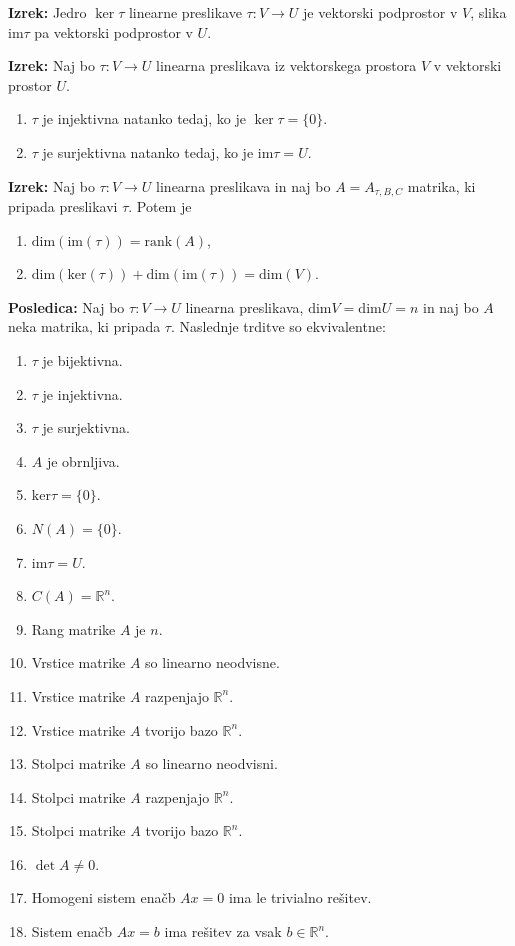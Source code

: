 \documentclass{article}
\begin{document}
\begin{multicols}{2}
	\textbf{Izrek:} Jedro \( \ker \tau \) linearne preslikave \( \tau: V \rightarrow U \) je vektorski podprostor v \( V \), slika \( \text{im} \tau \) pa vektorski podprostor v \( U \).

	\textbf{Izrek:} Naj bo \( \tau: V \rightarrow U \) linearna preslikava iz vektorskega prostora \( V \) v vektorski prostor \( U \).
	\begin{enumerate}
		\item \( \tau \) je injektivna natanko tedaj, ko je \( \ker \tau = \{0\} \).
		\item \( \tau \) je surjektivna natanko tedaj, ko je \( \text{im} \tau = U \).
	\end{enumerate}

	\textbf{Izrek:} Naj bo \( \tau: V \rightarrow U \) linearna preslikava in naj bo \( A = A_{\tau,B,C} \) matrika, ki pripada preslikavi \( \tau \). Potem je
	\begin{enumerate}
		\item \( \text{dim}(\text{im}(\tau)) = \text{rank}(A) \),
		\item \( \text{dim}(\text{ker}(\tau)) + \text{dim}(\text{im}(\tau)) = \text{dim}(V) \).
	\end{enumerate}

	\textbf{Posledica:} Naj bo \( \tau: V \rightarrow U \) linearna preslikava, \(\text{dim} V = \text{dim} U = n\) in naj bo \( A \) neka matrika, ki pripada \( \tau \). Naslednje trditve so ekvivalentne:
	\begin{enumerate}
		\item \( \tau \) je bijektivna.
		\item \( \tau \) je injektivna.
		\item \( \tau \) je surjektivna.
		\item \( A \) je obrnljiva.
		\item \( \text{ker} \tau = \{0\} \).
		\item \( N(A) = \{0\} \).
		\item \( \text{im} \tau = U \).
		\item \( C(A) = \mathbb{R}^n \).
		\item Rang matrike \( A \) je \( n \).
		\item Vrstice matrike \( A \) so linearno neodvisne.
		\item Vrstice matrike \( A \) razpenjajo \( \mathbb{R}^n \).
		\item Vrstice matrike \( A \) tvorijo bazo \( \mathbb{R}^n \).
		\item Stolpci matrike \( A \) so linearno neodvisni.
		\item Stolpci matrike \( A \) razpenjajo \( \mathbb{R}^n \).
		\item Stolpci matrike \( A \) tvorijo bazo \( \mathbb{R}^n \).
		\item \( \det A \neq 0 \).
		\item Homogeni sistem enačb \( Ax = 0 \) ima le trivialno rešitev.
		\item Sistem enačb \( Ax = b \) ima rešitev za vsak \( b \in \mathbb{R}^n \).
	\end{enumerate}


\end{multicols}
\end{document}

